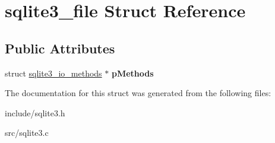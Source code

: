 \hypertarget{structsqlite3__file}{\section{sqlite3\-\_\-file Struct Reference}
\label{structsqlite3__file}
}
\subsection*{Public Attributes}
\begin{DoxyCompactItemize}
\item 
\hypertarget{structsqlite3__file_afb7c7beec15f0867d22f5260fcee24d3}{struct \hyperlink{structsqlite3__io__methods}{sqlite3\-\_\-io\-\_\-methods} $\ast$ {\bfseries p\-Methods}}\label{structsqlite3__file_afb7c7beec15f0867d22f5260fcee24d3}

\end{DoxyCompactItemize}


The documentation for this struct was generated from the following files\-:\begin{DoxyCompactItemize}
\item 
include/sqlite3.\-h\item 
src/sqlite3.\-c\end{DoxyCompactItemize}
